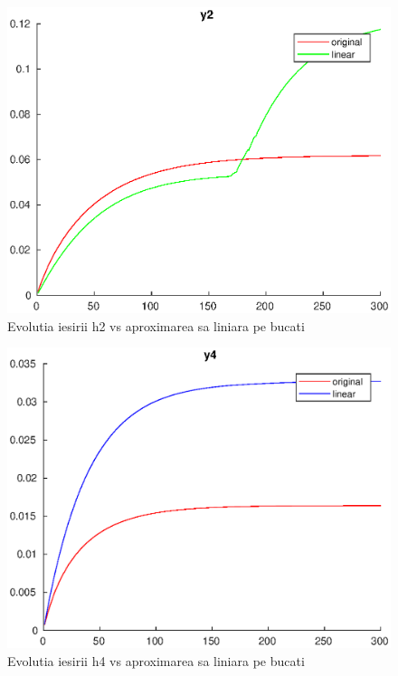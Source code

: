 \documentclass[12pt,english]{article}
\begin{document}
\begin{figure} [H]
	\includegraphics[width=1\textwidth]{fgh_1.eps}
	\caption{Evolutia iesirii h2 vs aproximarea sa liniara pe bucati}
\end{figure}

\begin{figure} [H]
	\includegraphics[width=1\textwidth]{fgh_2.eps}
	\caption{Evolutia iesirii h4 vs aproximarea sa liniara pe bucati}
\end{figure}


\end{document}
